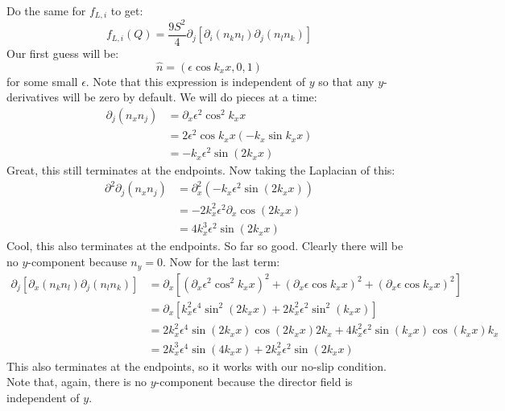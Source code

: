 \documentclass[reqno]{article}
\begin{document}
	Do the same for $f_{L, i}$ to get:
	\begin{equation}
		f_{L, i} (Q) = \frac{9 S^2}{4} \partial_j 
		\left[
		\partial_i \left( n_k n_l \right)
		\partial_j \left( n_l n_k \right)
		\right]
	\end{equation}
	Our first guess will be:
	\begin{equation}
		\hat{n} = \left( \epsilon \cos k_x x, 0, 1 \right)
	\end{equation}
	for some small $\epsilon$. 
	Note that this expression is independent of $y$ so that any $y$-derivatives will be zero by default.
	We will do pieces at a time:
	\begin{equation}
	\begin{split}
		\partial_j \left( n_x n_j \right)
		&= \partial_x \epsilon^2 \cos^2 k_x x \\
		&= 2 \epsilon^2 \cos k_x x \left( -k_x \sin k_x x \right) \\
		&= -k_x \epsilon^2 \sin \left( 2 k_x x \right)
	\end{split}
	\end{equation}
	Great, this still terminates at the endpoints.
	Now taking the Laplacian of this:
	\begin{equation}
	\begin{split}
		\partial^2 \partial_j \left( n_x n_j \right)
		&= \partial_x^2 \left( -k_x \epsilon^2 \sin \left( 2 k_x x \right) \right) \\
		&= - 2 k_x^2 \epsilon^2 \partial_x \cos \left( 2 k_x x \right) \\
		&= 4 k_x ^3 \epsilon^2 \sin \left( 2 k_x x \right)
	\end{split}
	\end{equation}
	Cool, this also terminates at the endpoints. 
	So far so good.
	Clearly there will be no $y$-component because $n_y = 0$.
	Now for the last term:
	\begin{equation}
	\begin{split}
		\partial_j \left[ 
		\partial_x \left( n_k n_l \right) 
		\partial_j \left( n_l n_k \right) 
		\right] 
		&= \partial_x
		\left[
		\left( \partial_x \epsilon^2 \cos^2 k_x x \right)^2
		+ \left( \partial_x \epsilon \cos k_x x \right)^2
		+ \left( \partial_x \epsilon \cos k_x x \right)^2
		\right] \\
		&= \partial_x
		\left[
		k_x^2 \epsilon^4 \sin^2 \left( 2 k_x x \right)
		+ 2 k_x^2 \epsilon^2 \sin^2 \left( k_x x \right) 
		\right] \\
		&= 2 k_x^2 \epsilon^4 \sin \left( 2 k_x x \right)
		\cos \left( 2 k_x x \right) 2 k_x
		+ 4 k_x^2 \epsilon^2 \sin \left( k_x x \right)
		\cos \left( k_x x \right) k_x \\
		&= 2 k_x^3 \epsilon^4 \sin \left( 4 k_x x \right)
		+ 2 k_x^2 \epsilon^2 \sin \left( 2 k_x x \right)
	\end{split}
	\end{equation}
	This also terminates at the endpoints, so it works with our no-slip condition. Note that, again, there is no $y$-component because the director field is independent of $y$. 
	
\end{document}
